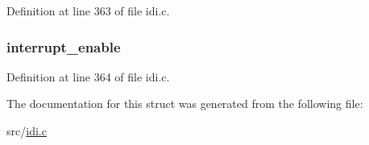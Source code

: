 Definition at line 363 of file idi.\+c.

\hypertarget{structdin__cfg_af2843635bd1b2022a5e6dcaec702d780}{
\subsubsection[{interrupt\+\_\+enable}]{ interrupt\+\_\+enable}}\label{structdin__cfg_af2843635bd1b2022a5e6dcaec702d780}


Definition at line 364 of file idi.\+c.



The documentation for this struct was generated from the following file\+:\begin{DoxyCompactItemize}
\item 
src/\hyperlink{idi_8c}{idi.\+c}\end{DoxyCompactItemize}
